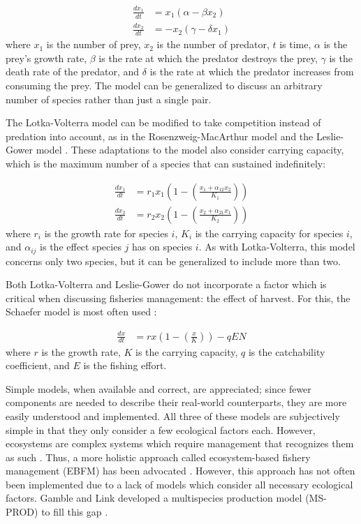\documentclass{article}
\begin{document}
\begin{align}
   \frac{d x_1}{dt} &=   x_1 \left(\alpha - \beta  x_2\right) 
\\ \frac{d x_2}{dt} &= - x_2 \left(\gamma - \delta x_1\right)
\end{align}
where $x_1$ is the number of prey, $x_2$ is the number of predator, $t$ is time, $\alpha$ is the prey's growth rate, $\beta$ is the rate at which the predator destroys the prey, $\gamma$ is the death rate of the predator, and $\delta$ is the rate at which the predator increases from consuming the prey.  The model can be generalized to discuss an arbitrary number of species rather than just a single pair.

The Lotka-Volterra model can be modified to take competition instead of predation into account, as in the Rosenzweig-MacArthur model \cite{Rosenzweig1963Graphical} and the Leslie-Gower model \cite{leslie1960}.  These adaptations to the model also consider carrying capacity, which is the maximum number of a species that can sustained indefinitely:

\begin{align}
   \frac{d x_1}{dt} &= r_1 x_1 \left(1 - \left(\frac{x_1 + \alpha_{12} x_2}{K_1}\right)\right)
\\ \frac{d x_2}{dt} &= r_2 x_2 \left(1 - \left(\frac{x_2 + \alpha_{21} x_1}{K_2}\right)\right)
\end{align}
where $r_i$ is the growth rate for species $i$, $K_i$ is the carrying capacity for species $i$, and $\alpha_{ij}$ is the effect species $j$ has on species $i$.  As with Lotka-Volterra, this model concerns only two species, but it can be generalized to include more than two.

Both Lotka-Volterra and Leslie-Gower do not incorporate a factor which is critical when discussing fisheries management: the effect of harvest.  For this, the Schaefer model is most often used \cite{schaefer1957}:

\begin{align}
   \frac{d x}{dt} &= r x \left(1 - \left(\frac{x}{K}\right)\right) - q E N
\end{align}
where $r$ is the growth rate, $K$ is the carrying capacity, $q$ is the catchability coefficient, and $E$ is the fishing effort.

Simple models, when available and correct, are appreciated; since fewer components are needed to describe their real-world counterparts, they are more easily understood and implemented.  All three of these models are subjectively simple in that they only consider a few ecological factors each. However, ecosystems are complex systems which require management that recognizes them as such \cite{Christensen1996Report}.  Thus, a more holistic approach called ecosystem-based fishery management (EBFM) has been advocated \cite{united1999ecosystem}.  However, this approach has not often been implemented due to a lack of models which consider all necessary ecological factors.  Gamble and Link developed a multispecies production model (MS-PROD) to fill this gap \cite{Gamble20092570}.%
\end{document}

